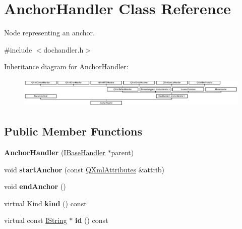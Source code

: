 \hypertarget{class_anchor_handler}{}\section{Anchor\+Handler Class Reference}
\label{class_anchor_handler}


Node representing an anchor.  




{\ttfamily \#include $<$dochandler.\+h$>$}

Inheritance diagram for Anchor\+Handler\+:\begin{figure}[H]
\begin{center}
\leavevmode
\includegraphics[height=1.461187cm]{class_anchor_handler}
\end{center}
\end{figure}
\subsection*{Public Member Functions}
\begin{DoxyCompactItemize}
\item 
\mbox{\label{class_anchor_handler_a7fd18137b2ef43f182b1946c37f21bb8}} 
{\bfseries Anchor\+Handler} (\mbox{\hyperlink{class_i_base_handler}{I\+Base\+Handler}} $\ast$parent)
\item 
\mbox{\label{class_anchor_handler_aa7706556e4685c8e41fc2612491645a0}} 
void {\bfseries start\+Anchor} (const \mbox{\hyperlink{class_q_xml_attributes}{Q\+Xml\+Attributes}} \&attrib)
\item 
\mbox{\label{class_anchor_handler_a373370ed61d2242725fc580c7babc23e}} 
void {\bfseries end\+Anchor} ()
\item 
\mbox{\label{class_anchor_handler_a94c3441bd1d3acbc10519f4febecd729}} 
virtual Kind {\bfseries kind} () const
\item 
\mbox{\label{class_anchor_handler_af58eb376a5d177ca023f772a7d6aea1b}} 
virtual const \mbox{\hyperlink{class_i_string}{I\+String}} $\ast$ {\bfseries id} () const
\end{DoxyCompactItemize}
